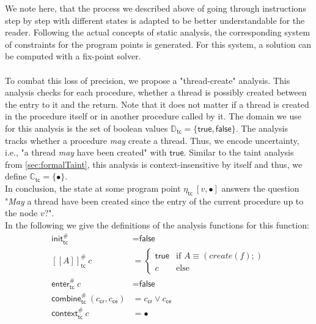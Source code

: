   We note here, that the process we described above of going through instructions step by step with different states is adapted to be better understandable for the reader. Following the actual concepts of static analysis, the corresponding system of constraints for the program points is generated. For this system, a solution can be computed with a fix-point solver.\\
  \\
  To combat this loss of precision, we propose a "thread-create" analysis. This analysis checks for each procedure, whether a thread is possibly created between the entry to it and the return. Note that it does not matter if a thread is created in the procedure itself or in another procedure called by it. The domain we use for this analysis is the set of boolean values $\mathbb{D}_\textsf{tc} = \{\textsf{true}, \textsf{false}\}$. The analysis tracks whether a procedure \textit{may} create a thread. Thus, we encode uncertainty, i.e., "a thread \textit{may} have been created" with $\textsf{true}$. Similar to the taint analysis from \autoref{sec:formalTaint}, this analysis is context-insensitive by itself and thus, we define $\mathbb{C}_\textsf{tc} = \{\bullet\}$.\\
  In conclusion, the state at some program point $\eta_\textsf{tc}\ [v,\bullet]$ answers the question "\textit{May} a thread have been created since the entry of the current procedure up to the node $v$?".\\
  In the following we give the definitions of the analysis functions for this function:
  \begin{align*}
    \textsf{init}^{\#}_\textsf{tc} &= \textsf{false}\\
    [\![ A ]\!]^{\#}_\textsf{tc}\ c &= \left\{ \begin{array}{ll}
      \textsf{true} & \text{if }A \equiv (create(f);)\\
      c & \text{else}
    \end{array} \right. \\
    \textsf{enter}^{\#}_\textsf{tc}\ c &= \textsf{false}\\
    \textsf{combine}^{\#}_\textsf{tc}\ (c_\textsf{cr}, c_\textsf{ce}) &= c_\textsf{cr} \lor c_\textsf{ce}\\
    \textsf{context}^{\#}_\textsf{tc}\ c &= \bullet\\
  \end{align*}
  
